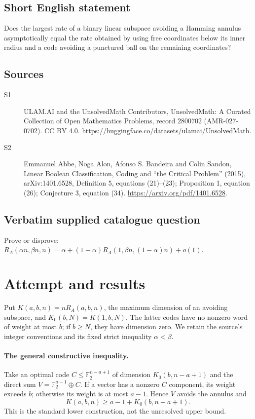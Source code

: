 \documentclass[11pt]{article}
\begin{document}
\subsection{Short English statement}
Does the largest rate of a binary linear subspace avoiding a Hamming annulus asymptotically equal the rate obtained by using free coordinates below its inner radius and a code avoiding a punctured ball on the remaining coordinates?
\subsection{Sources}
\begin{description}
\item[S1] ULAM.AI and the UnsolvedMath Contributors, UnsolvedMath: A Curated Collection of Open Mathematics Problems, record 2800702 (AMR-027-0702). CC BY 4.0. \url{https://huggingface.co/datasets/ulamai/UnsolvedMath}.
\item[S2] Emmanuel Abbe, Noga Alon, Afonso S. Bandeira and Colin Sandon, Linear Boolean Classification, Coding and “the Critical Problem” (2015), arXiv:1401.6528, Definition 5, equations (21)–(23); Proposition 1, equation (26); Conjecture 3, equation (34). \url{https://arxiv.org/pdf/1401.6528}.
\end{description}
\subsection{Verbatim supplied catalogue question}
Prove or disprove: $R_A(\alpha n,\beta n,n)=\alpha+(1-\alpha)R_A(1,\beta n,(1-\alpha)n)+o(1)$.

\section{Attempt and results}
Put $K(a,b,n)=nR_A(a,b,n)$, the maximum dimension of an avoiding subspace,
and $K_0(b,N)=K(1,b,N)$. The latter codes have no nonzero word of weight
at most $b$; if $b\ge N$, they have dimension zero. We retain the source's
integer conventions and its fixed strict inequality $\alpha<\beta$.

\paragraph{The general constructive inequality.}
Take an optimal code $C\le\mathbb F_2^{n-a+1}$ of dimension $K_0(b,n-a+1)$
and the direct sum $V=\mathbb F_2^{a-1}\oplus C$. If a vector has a nonzero
$C$ component, its weight exceeds $b$; otherwise its weight is at most
$a-1$. Hence $V$ avoids the annulus and
\[
K(a,b,n)\ge a-1+K_0(b,n-a+1).
\]
This is the standard lower construction, not the unresolved upper bound.
\end{document}
